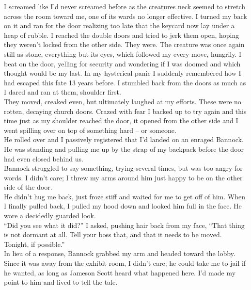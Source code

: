 \documentclass[a5paper]{scrartcl}
\begin{document}
I screamed like I'd never screamed before as the creatures neck seemed to stretch across the room toward me, one of its wards no longer effective. I turned my back on it and ran for the door realizing too late that the keycard now lay under a heap of rubble. I reached the double doors and tried to jerk them open, hoping they weren't locked from the other side. They were.  The creature was once again still as stone, everything but its eyes, which followed my every move, hungrily.
I beat on the door, yelling for security and wondering if I was doomed and which thought would be my last. In my hysterical panic I suddenly remembered how I had escaped this fate 13 years before. I stumbled back from the doors as much as I dared and ran at them, shoulder first.\\


They moved, creaked even, but ultimately laughed at my efforts. These were no rotten, decaying church doors. Crazed with fear I backed up to try again and this time just as my shoulder reached the door, it opened from the other side and I went spilling over on top of something hard -- or someone. \\


He rolled over and I passively registered that I'd landed on an enraged Bannock. He was standing and pulling me up by the strap of my backpack before the door had even closed behind us.  \\


Bannock struggled to say something, trying several times, but was too angry for words. I didn't care; I threw my arms around him just happy to be on the other side of the door. \\


He didn't hug me back, just froze stiff and waited for me to get off of him. When I finally pulled back, I pulled my hood down and looked him full in the face. He wore a decidedly guarded look.   \\


\enquote{Did you see what it did?} I asked, pushing hair back from my face, \enquote{That thing is not dormant at all. Tell your boss that, and that it needs to be moved. Tonight, if possible.}\\


In lieu of a response, Bannock grabbed my arm and headed toward the lobby. Since it was away from the exhibit room, I didn't care; he could take me to jail if he wanted, as long as Jameson Scott heard what happened here. I'd made my point to him and lived to tell the tale. \\
\end{document}
